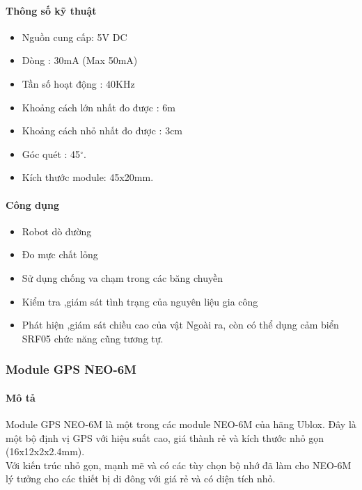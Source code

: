 \paragraph{Thông số kỹ thuật}
\begin{itemize}
\item Nguồn cung cấp: 5V DC
\item Dòng : 30mA (Max 50mA)
\item Tần số hoạt động : 40KHz
\item Khoảng cách lớn nhất đo được  : 6m
\item Khoảng cách nhỏ nhất đo được : 3cm
\item Góc quét : 45$^\circ$.
\item Kích thước module: 45x20mm.
\end{itemize}
\paragraph{Công dụng}
\begin{itemize}
\item Robot dò đường
\item Đo mực chất lỏng
\item Sử dụng chống va chạm trong các băng chuyền
\item Kiểm tra ,giám sát tình trạng của nguyên liệu gia công
\item Phát hiện ,giám sát chiều cao của vật
Ngoài ra, còn có thể dụng cảm biển SRF05 chức năng cũng tương tự.
\end{itemize}
\subsubsection{Module GPS NEO-6M}
\label{ref{fig3_7}}
\paragraph{Mô tả}
Module GPS NEO-6M là một trong các module NEO-6M của hãng Ublox. Đây là một bộ định vị GPS với hiệu suất cao, giá thành rẻ và kích thước nhỏ gọn (16x12x2x2.4mm).\\
Với kiến trúc nhỏ gọn, mạnh mẽ và có các tùy chọn bộ nhớ đã làm cho NEO-6M lý tưởng cho các thiết bị di đông với giá rẻ và có diện tích nhỏ.
